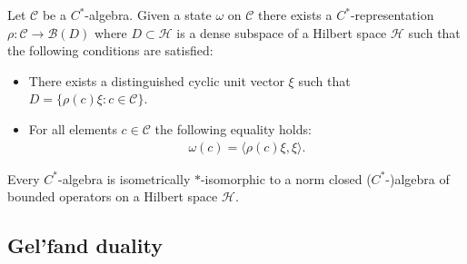 
    \begin{construct}
        Let $\mathcal{C}$ be a $C^*$-algebra. Given a state $\omega$ on $\mathcal{C}$ there exists a $C^*$-representation $\rho:\mathcal{C}\rightarrow\mathcal{B}(D)$ where $D\subset\mathcal{H}$ is a dense subspace of a Hilbert space $\mathcal{H}$ such that the following conditions are satisfied:
        \begin{itemize}
            \item There exists a distinguished cyclic unit vector $\xi$ such that $D = \{\rho(c)\xi: c\in\mathcal{C}\}$.
            \item For all elements $c\in\mathcal{C}$ the following equality holds:
            \begin{gather}
                \omega(c) = \langle \rho(c)\xi,\xi \rangle.
            \end{gather}
        \end{itemize}
    \end{construct}

    \begin{theorem}
        Every $C^*$-algebra is isometrically $\ast$-isomorphic to a norm closed ($C^*$-)algebra of bounded operators on a Hilbert space $\mathcal{H}$.
    \end{theorem}

\subsection{Gel'fand duality}

